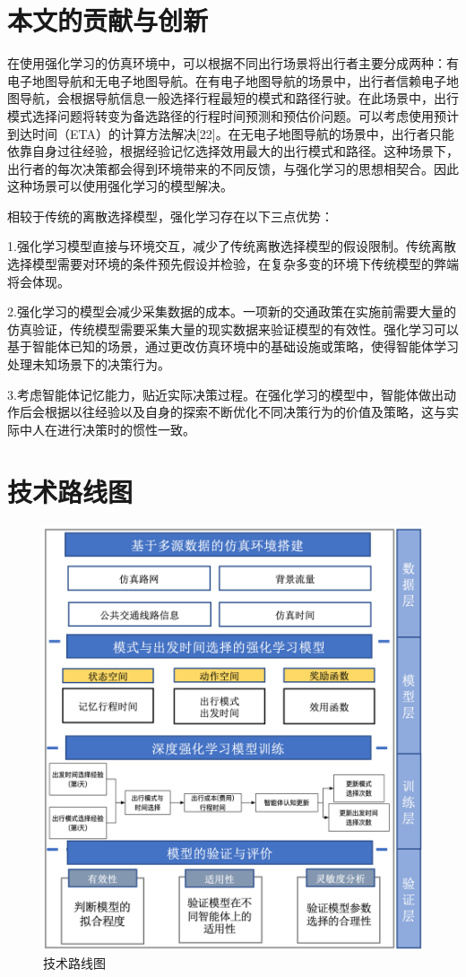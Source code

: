 \section{本文的贡献与创新}

在使用强化学习的仿真环境中，可以根据不同出行场景将出行者主要分成两种：有电子地图导航和无电子地图导航。在有电子地图导航的场景中，出行者信赖电子地图导航，会根据导航信息一般选择行程最短的模式和路径行驶。在此场景中，出行模式选择问题将转变为备选路径的行程时间预测和预估价问题。可以考虑使用预计到达时间（ETA）的计算方法解决[22]。在无电子地图导航的场景中，出行者只能依靠自身过往经验，根据经验记忆选择效用最大的出行模式和路径。这种场景下，出行者的每次决策都会得到环境带来的不同反馈，与强化学习的思想相契合。因此这种场景可以使用强化学习的模型解决。

相较于传统的离散选择模型，强化学习存在以下三点优势：

1.强化学习模型直接与环境交互，减少了传统离散选择模型的假设限制。传统离散选择模型需要对环境的条件预先假设并检验，在复杂多变的环境下传统模型的弊端将会体现。

2.强化学习的模型会减少采集数据的成本。一项新的交通政策在实施前需要大量的仿真验证，传统模型需要采集大量的现实数据来验证模型的有效性。强化学习可以基于智能体已知的场景，通过更改仿真环境中的基础设施或策略，使得智能体学习处理未知场景下的决策行为。

3.考虑智能体记忆能力，贴近实际决策过程。在强化学习的模型中，智能体做出动作后会根据以往经验以及自身的探索不断优化不同决策行为的价值及策略，这与实际中人在进行决策时的惯性一致。


\section{技术路线图}

\begin{figure}[htbp]
  \centering
  \includegraphics[width=0.92\linewidth]{figures/content/flowchart.png}
  \caption{技术路线图}
  \label{flowchart}
\end{figure}